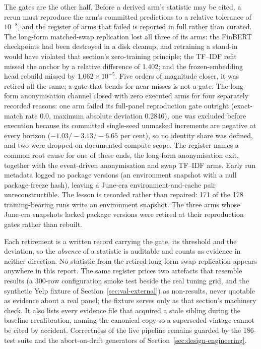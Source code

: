 The gates are the other half. Before a derived arm's statistic may be cited, a rerun must reproduce the arm's committed predictions to a relative tolerance of $10^{-8}$, and the register of arms that failed is reported in full rather than curated. The long-form matched-swap replication lost all three of its arms: the FinBERT checkpoints had been destroyed in a disk cleanup, and retraining a stand-in would have violated that section's zero-training principle; the TF--IDF refit missed the anchor by a relative difference of 1.402; and the frozen-embedding head rebuild missed by $1.062\times10^{-5}$. Five orders of magnitude closer, it was retired all the same; a gate that bends for near-misses is not a gate. %
The long-form anonymisation channel closed with zero executed arms for four separately recorded reasons: one arm failed its full-panel reproduction gate outright (exact-match rate 0.0, maximum absolute deviation 0.2846), one was excluded before execution because its committed single-seed unmasked increments are negative at every horizon ($-1.03/-3.13/-6.65$ per cent), so no identity share was defined, and two were dropped on documented compute scope. %
The register names a common root cause for one of these ends, the long-form anonymisation exit, together with the event-driven anonymisation and swap TF--IDF arms. Early run metadata logged no package versions (an environment snapshot with a null package-freeze hash), leaving a June-era environment-and-cache pair unreconstructible. %
The lesson is recorded rather than repaired: 171 of the 178 training-bearing runs write an environment snapshot. %
 The three arms whose June-era snapshots lacked package versions were retired at their reproduction gates rather than rebuilt.

Each retirement is a written record carrying the gate, its threshold and the deviation, so the \emph{absence} of a statistic is auditable and counts as evidence in neither direction. No statistic from the retired long-form swap replication appears anywhere in this report. %
The same register prices two artefacts that resemble results (a 300-row configuration smoke test beside the real tuning grid, and the synthetic Yelp fixture of Section~\ref{sec:val-external}) as non-results, never quotable as evidence about a real panel; the fixture serves only as that section's machinery check. It also lists every evidence file that acquired a stale sibling during the baseline recalibration, naming the canonical copy so a superseded vintage cannot be cited by accident. %
Correctness of the live pipeline remains guarded by the 186-test suite and the abort-on-drift generators of Section~\ref{sec:design-engineering}. %

